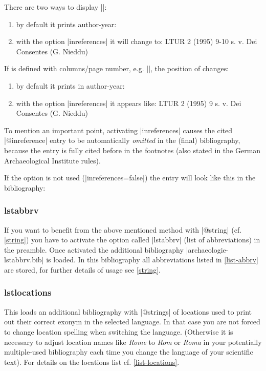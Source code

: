 \documentclass[a4paper,
10pt,
greek,
french,
spanish,
italian,
ngerman,
english
]{ltxdoc}
\begin{document}
\begin{refsection}
There are two ways to display |\cite{Nieddu1995}|:

\begin{bsp}
\begin{enumerate}
\item by default it prints author-year:
\cite{Nieddu1995}
\item with the option |inreferences| it will change to:
LTUR 2 (1995) 9-10 s. v. Dei Consentes (G. Nieddu)
\end{enumerate}
\end{bsp}

If  is defined with columns/page number, e.g. |\cite[9]{Nieddu1995}|, 
the position of  changes:

\begin{bsp}
\begin{enumerate} 
\item by default it prints in author-year:
\cite[9]{Nieddu1995}
\item with the option |inreferences| it appears like:
LTUR 2 (1995) 9 s. v. Dei Consentes (G. Nieddu)
\end{enumerate}
\end{bsp}

To mention an important point, activating |inreferences| causes the cited |@inreference| entry to be automatically \emph{omitted} in the (final) bibliography,
because the entry is fully cited before in the footnotes (also stated in the German Archaeological Institute rules).

If the option is not used (|inreferences=false|) the entry will look like this in the bibliography:
\end{refsection}


\subsubsection{lstabbrv}\label{abbrv}
If you want to benefit from the above mentioned method with |@string| (cf. \cref{string}) you have to activate the option called |lstabbrv| (list of abbreviations) in the preamble.
Once activated the additional bibliography |archaeologie-lstabbrv.bib| is loaded. 
In this bibliography all abbreviations listed in \cref{list-abbrv} are stored, for further details of usage see \cref{string}.

\subsubsection{lstlocations}\label{lstlocations}
This loads an additional bibliography with |@strings| of locations used to print out their correct exonym in the selected language. In that case you are not forced to change location spelling when switching the language. 
(Otherwise it is necessary to adjust location names like \emph{Rome} to \emph{Rom} or \emph{Roma} in your potentially multiple-used bibliography each time you change the language of your scientific text).
For details on the locations list cf. \cref{list-locations}.
\end{document}

